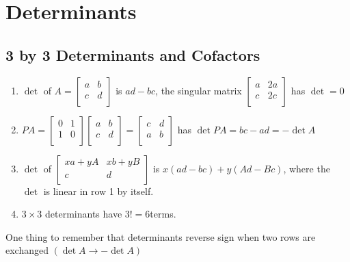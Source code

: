 \chapter{Determinants}
\section{3 by 3 Determinants and Cofactors}

\begin{enumerate}
    \item \(\det \) of \(A= \begin{bmatrix}
        a & b  \\
        c & d  \\
    \end{bmatrix}\) 
    is \(ad - bc\), the singular matrix \(\begin{bmatrix}
        a & 2a  \\
        c & 2c  \\
    \end{bmatrix}\) 
    has \(\det  = 0\)
    \item \(P A = \begin{bmatrix}
        0 & 1  \\
        1 & 0  \\
    \end{bmatrix}
    \begin{bmatrix}
        a & b  \\
        c & d  \\
    \end{bmatrix}
    = 
    \begin{bmatrix}
        c & d  \\
        a & b  \\
    \end{bmatrix}\)  
    has \(\det  P A = bc - ad = - \det A\)  
    \item \(\det \) of \(\begin{bmatrix}
        xa + yA & xb + yB  \\
        c & d  \\
    \end{bmatrix}\) 
    is \(x(ad - bc) + y(Ad - Bc)\), where the \(\det \)  is linear in row 1 by itself. 
    \item \(3 \times 3\)  determinants have \(3! = 6\)terms. 
\end{enumerate}

One thing to remember that determinants reverse sign when two rows are exchanged \((\det A \rightarrow -\det A)\) 

